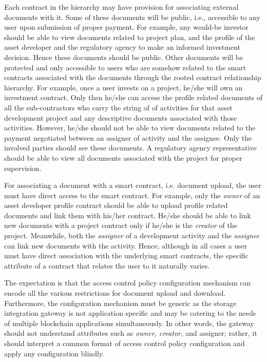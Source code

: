 Each contract in the hierarchy may have provision for associating external documents with it. Some of these documents will be public, i.e., accessible to any user upon submission of proper payment. For example, any would-be investor should be able to view documents related to project plan, and the profile of the asset developer and the regulatory agency to make an informed investment decision. Hence these documents should be public. Other documents will be protected and only accessible to users who are somehow related to the smart contracts associated with the documents through the rooted contract relationship hierarchy. For example, once a user invests on a project, he/she will own an investment contract. Only then he/she can access the profile related documents of all the sub-contractors who carry the string of of activities for that asset development project and any descriptive documents associated with those activities. However, he/she should not be able to view documents related to the payment negotiated between an assigner of activity and the assignee. Only the involved parties should see these documents. A regulatory agency representative should be able to view all documents associated with the project for proper supervision.    

For associating a document with a smart contract, i.e. document upload, the user must have direct access to the smart contract. For example, only the {\it owner} of an asset developer profile contract should be able to upload profile related documents and link them with his/her contract. He/she should be able to link new documents with a project contract only if he/she is the {\it creator} of the project. Meanwhile, both the {\it assigner} of a development activity and the {\it assignee} can link new documents with the activity. Hence, although in all cases a user must have direct association with the underlying smart contracts, the specific attribute of a contract that relates the user to it naturally varies.   

The expectation is that the access control policy configuration mechanism can encode all the various restrictions for document upload and download. Furthermore, the configuration mechanism must be generic as the storage integration gateway is not application specific and may be catering to the needs of multiple blockchain applications simultaneously. In other words, the gateway should not understand attributes such as {\it owner, creator,} and {assigner}; rather, it should interpret a common format of access control policy configuration and apply any configuration blindly.      
 
